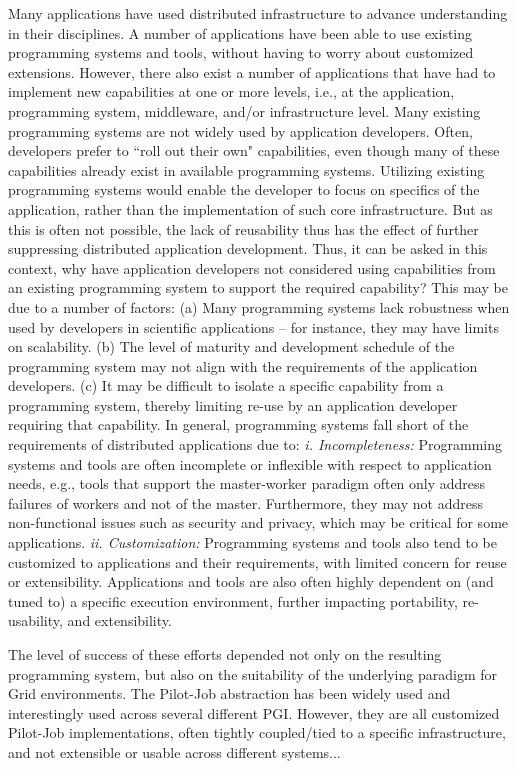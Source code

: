 \documentclass[conference,final]{IEEEtran}
\begin{document}
Many applications have used distributed infrastructure to advance
understanding in their disciplines. A number of applications have been
able to use existing programming systems and tools, without having to
worry about customized extensions. However, there also exist a number
of applications that have had to implement new capabilities at one or
more levels, i.e., at the application, programming system, middleware,
and/or infrastructure level.  Many existing programming systems are
not widely used by application developers. Often, developers prefer to
``roll out their own" capabilities, even though many of these
capabilities already exist in available programming systems.
Utilizing existing programming systems would enable the developer to
focus on specifics of the application, rather than the implementation
of such core infrastructure. But as this is often not possible, the
lack of reusability thus has the effect of further suppressing
distributed application development. Thus, it can be asked in this
context, why have application developers not considered using
capabilities from an existing programming system to support the
required capability? This may be due to a number of factors: (a) Many
programming systems lack robustness when used by developers in
scientific applications -- for instance, they may have limits on
scalability. (b) The level of maturity and development schedule of the
programming system may not align with the requirements of the
application developers. (c) It may be difficult to isolate a specific
capability from a programming system, thereby limiting re-use by an
application developer requiring that capability. In general,
programming systems fall short of the requirements of distributed
applications due to: {\em i. Incompleteness:} Programming systems and
tools are often incomplete or inflexible with respect to application
needs, e.g., tools that support the master-worker paradigm often only
address failures of workers and not of the master. Furthermore, they
may not address non-functional issues such as security and privacy,
which may be critical for some applications.  {\em ii. Customization:}
Programming systems and tools also tend to be customized to
applications and their requirements, with limited concern for reuse or
extensibility.  Applications and tools are also often highly dependent
on (and tuned to) a specific execution environment, further impacting
portability, re-usability, and extensibility.

The level of success of these efforts depended not only on the
resulting programming system, but also on the suitability of the
underlying paradigm for Grid environments. The Pilot-Job abstraction
has been widely used and interestingly used across several different
PGI. However, they are all customized Pilot-Job implementations, often
tightly coupled/tied to a specific infrastructure, and not extensible
or usable across different systems...
\end{document}
